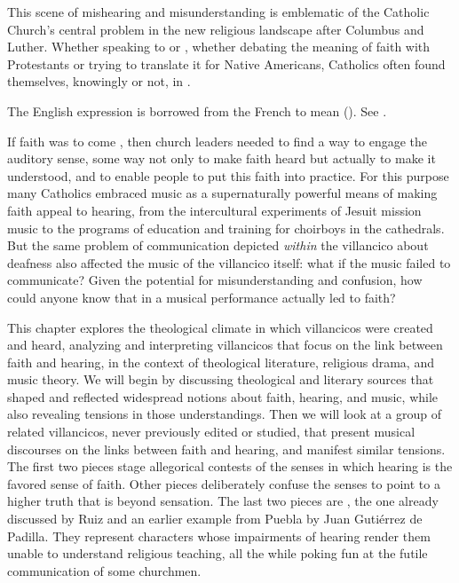 
This scene of mishearing and misunderstanding is emblematic of the Catholic
Church's central problem in the new religious landscape after Columbus and
Luther.
Whether speaking to  or , whether debating the
meaning of faith with Protestants or trying to translate it for Native
Americans, Catholics often found themselves, knowingly or not, in
.%
\begin{Footnote}
    The English expression is borrowed from the French 
    to mean 
    (\autocite[]{OED}).
    See \autocite{MacGaffey:DialoguesDeaf}. %
\end{Footnote}

If faith was to come , then church leaders needed to
find a way to engage the auditory sense, some way not only to make faith heard
but actually to make it understood, and to enable people to put this faith into
practice.
For this purpose many Catholics embraced music as a supernaturally powerful
means of making faith appeal to hearing, from the intercultural experiments of
Jesuit mission music to the programs of education and training for choirboys in
the cathedrals.
But the same problem of communication depicted \emph{within} the villancico
about deafness also affected the music of the villancico itself: what if the
music failed to communicate?
Given the potential for misunderstanding and confusion, how could anyone know
that  in a musical performance actually led to faith?

This chapter explores the theological climate in which villancicos were created
and heard, analyzing and interpreting villancicos that focus on the link between
faith and hearing, in the context of theological literature, religious drama,
and music theory.
We will begin by discussing theological and literary sources that shaped and
reflected widespread notions about faith, hearing, and music, while also
revealing tensions in those understandings.
Then we will look at a group of related villancicos, never previously edited or
studied, that present musical discourses on the links between faith and hearing,
and manifest similar tensions.
The first two pieces stage allegorical contests of the senses in which hearing
is the favored sense of faith.
Other pieces deliberately confuse the senses to point to a higher truth that is
beyond sensation.
The last two pieces are , the one already
discussed by Ruiz and an earlier example from Puebla by Juan Gutiérrez de
Padilla.
They represent characters whose impairments of hearing render them unable to
understand religious teaching, all the while poking fun at the futile
communication of some churchmen.

